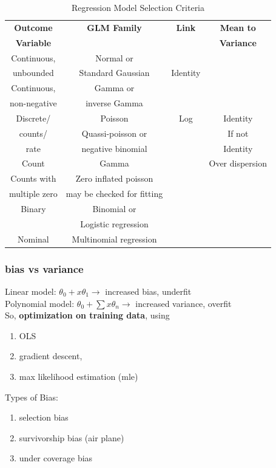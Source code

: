 \documentclass{beamer}
\begin{document}
\begin{frame}[plain]%
\begin{table}[h]
	\centering
	\begin{tabular}{cccc}
		\textbf{Outcome} & \textbf{GLM Family} & \textbf{Link} & \textbf{Mean to} \\
		\textbf{Variable} & & & \textbf{Variance} \\ 
		\hline %
		Continuous, & Normal or & \\ unbounded & Standard Gaussian & Identity &  \\  
		\hline
		Continuous, & Gamma or & \\ non-negative & inverse Gamma &  &  \\ \hline
		
		
		Discrete/ & Poisson & Log & Identity \\
		counts/ & Quassi-poisson or &  & If not \\
		rate & negative binomial & & Identity \\
		
		
		\hline
		
		Count & Gamma &  & Over dispersion \\ \hline
		Counts with & Zero inflated poisson & \\ multiple zero & may be checked 
		for fitting & & \\ \hline
		Binary & Binomial or & \\  & Logistic regression & & \\ \hline
		Nominal  & Multinomial regression & \\
		\hline
	\end{tabular} 
	\caption{Regression Model Selection Criteria}
\end{table}
\end{frame}

\begin{frame}\frametitle{bias vs variance}
	Linear model: $\theta_0 + x \theta_1 \rightarrow$ increased bias, underfit\\
	Polynomial model: $\theta_0 + \sum {x \theta_n} \rightarrow$ increased variance, overfit\\

	So, \textbf{optimization on training data}, using\\
	\begin{enumerate}
		\item OLS
		\item gradient descent, 
		\item max likelihood estimation (mle)
	\end{enumerate}
	
	Types of Bias:
	\begin{enumerate}
		\item selection bias
		\item survivorship bias (air plane)
		\item under coverage bias
	\end{enumerate}

\end{frame}
\end{document}
